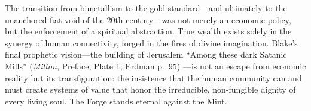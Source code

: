 \documentclass[
]{article}
\begin{document}
The transition from bimetallism to the gold standard---and ultimately to
the unanchored fiat void of the 20th century---was not merely an
economic policy, but the enforcement of a spiritual abstraction. True
wealth exists solely in the synergy of human connectivity, forged in the
fires of divine imagination. Blake's final prophetic vision---the
building of Jerusalem ``Among these dark Satanic Mills'' (\emph{Milton},
Preface, Plate 1; Erdman p.~95) \citep{erdman1988complete}---is not an
escape from economic reality but its transfiguration: the insistence
that the human community can and must create systems of value that honor
the irreducible, non-fungible dignity of every living soul. The Forge
stands eternal against the Mint.




\end{document}
